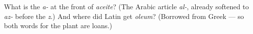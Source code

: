 \begin{tcolorbox}[breakable,colback=teal!4,colframe=teal!35!black,title={Before you move on}]
What is the \emph{a-} at the front of \emph{aceite}? (The Arabic article \emph{al-}, already softened to \emph{az-} before the \emph{z}.) And where did Latin get \emph{oleum}? (Borrowed from Greek — so both words for the plant are loans.)
\end{tcolorbox}
